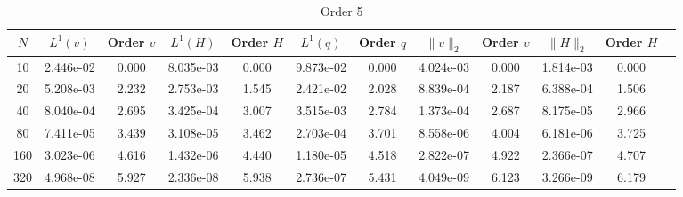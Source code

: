 \documentclass[english]{article}
\theoremstyle{thmstyleone}
\theoremstyle{thmstyletwo}
\theoremstyle{thmstylethree}
\begin{document}
\begin{table}[ht]
\begin{adjustbox}{width=1\textwidth}
\begin{subtable}{1.\linewidth}
			\centering
			\caption{Order 5}
			\begin{tabular}{cccccccccccc}
				\toprule
				$N$ & $L^1(v)$ & Order $v$ & $L^1(H)$ & Order $H$ & $L^1(q)$ & Order $q$ & $\|v\|_2$ & Order $v$ & $\|H\|_2$ & Order $H$ \\
				\midrule
				10 & 2.446e-02 & 0.000 & 8.035e-03 & 0.000 & 9.873e-02 & 0.000 & 4.024e-03 & 0.000 & 1.814e-03 & 0.000 \\
				20 & 5.208e-03 & 2.232 & 2.753e-03 & 1.545 & 2.421e-02 & 2.028 & 8.839e-04 & 2.187 & 6.388e-04 & 1.506 \\
				40 & 8.040e-04 & 2.695 & 3.425e-04 & 3.007 & 3.515e-03 & 2.784 & 1.373e-04 & 2.687 & 8.175e-05 & 2.966 \\
				80 & 7.411e-05 & 3.439 & 3.108e-05 & 3.462 & 2.703e-04 & 3.701 & 8.558e-06 & 4.004 & 6.181e-06 & 3.725 \\
				160 & 3.023e-06 & 4.616 & 1.432e-06 & 4.440 & 1.180e-05 & 4.518 & 2.822e-07 & 4.922 & 2.366e-07 & 4.707 \\
				320 & 4.968e-08 & 5.927 & 2.336e-08 & 5.938 & 2.736e-07 & 5.431 & 4.049e-09 & 6.123 & 3.266e-09 & 6.179 \\
				\bottomrule
			\end{tabular}
		\end{subtable}
	\end{adjustbox}
\end{table}
\end{document}
